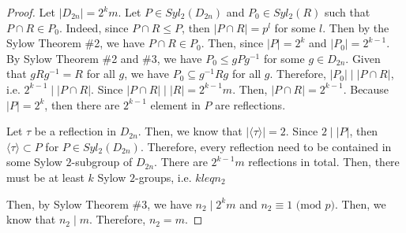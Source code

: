 \begin{answer}
    \begin{proof}
        Let $\lvert D_{2n} \rvert = 2^km$. Let $P \in Syl_2(D_{2n})$ and $P_0 \in Syl_2(R)$ such that $P\cap R \in P_0$. Indeed, since $P\cap R \leqslant P$, then $\lvert P \cap R \rvert = p^l$ for some $l$. Then by the Sylow Theorem \#2, we have $P\cap R \in P_0$. Then, since $\lvert P \rvert = 2^k$ and $\lvert P_0 \rvert = 2^{k-1}$. By Sylow Theorem \#2 and \#3, we have $P_0 \leqslant gPg^{-1}$ for some $g \in D_{2n}$. Given that $gRg^{-1} = R$ for all $g$, we have $P_0 \subseteq g^{-1}Rg$ for all $g$. Therefore, $\lvert P_0 \rvert \mid \lvert P \cap R\rvert$, i.e. $2^{k-1}\mid \lvert P \cap R \rvert$. Since $\lvert P \cap R \rvert \mid \lvert R \rvert = 2^{k-1}m$. Then, $\lvert P \cap R \rvert = 2^{k-1}$. Because $\lvert P \rvert = 2^k$, then there are $2^{k-1}$ element in $P$ are reflections.
        
        Let $\tau$ be a reflection in $D_{2n}$. Then, we know that $\lvert \langle \tau \rangle\rvert = 2$. Since $2 \mid \lvert P \rvert$, then $\langle \tau \rangle \subset P$ for $P \in Syl_2(D_{2n})$. Therefore, every reflection need to be contained in some Sylow $2$-subgroup of $D_{2n}$. There are $2^{k-1}m$ reflections in total. Then, there must be at least $k$ Sylow $2$-groups, i.e. $k leq n_2$
        
        Then, by Sylow Theorem \#3, we have $n_2 \mid 2^km$ and $n_2 \equiv 1 \text{ (mod $p$)}$. Then, we know that $n_2 \mid m$. Therefore, $n_2 = m$.
    \end{proof}
\end{answer}